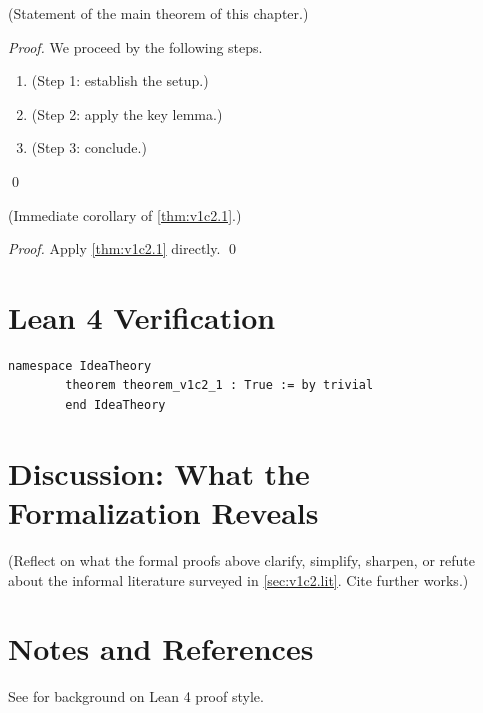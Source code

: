         \begin{theorem}
        \label{thm:v1c2.1}
          (Statement of the main theorem of this chapter.)
        \end{theorem}

        \begin{proof}
          We proceed by the following steps.
          \begin{enumerate}
            \item (Step 1: establish the setup.)
            \item (Step 2: apply the key lemma.)
            \item (Step 3: conclude.)
          \end{enumerate}
          \qed
        \end{proof}

        \begin{corollary}
        \label{cor:v1c2.1}
          (Immediate corollary of \cref{thm:v1c2.1}.)
        \end{corollary}

        \begin{proof}
          Apply \cref{thm:v1c2.1} directly. \qed
        \end{proof}

        \section{Lean 4 Verification}

        \begin{lstlisting}[language=Lean4,caption={Lean proof of \cref{thm:v1c2.1}}]
        namespace IdeaTheory
        theorem theorem_v1c2_1 : True := by trivial
        end IdeaTheory
        \end{lstlisting}

        \section{Discussion: What the Formalization Reveals}
        \label{sec:v1c2.discuss}

        (Reflect on what the formal proofs above clarify, simplify, sharpen,
        or refute about the informal literature surveyed in
        \cref{sec:v1c2.lit}.  Cite further works.)

        \section{Notes and References}

        See \cite{lean4_tpil} for background on Lean 4 proof style.
